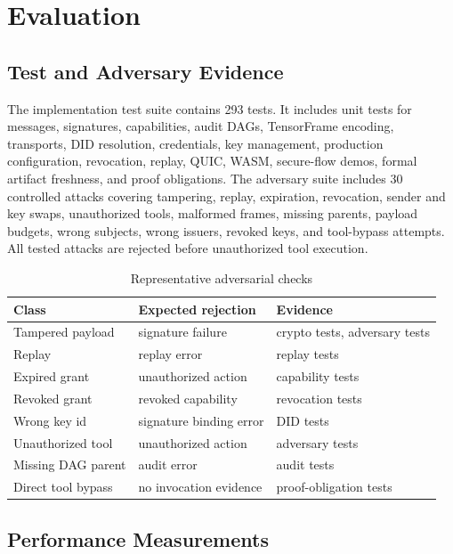 \documentclass[runningheads]{llncs}
\begin{document}
\section{Evaluation}

\subsection{Test and Adversary Evidence}

The implementation test suite contains 293 tests. It includes unit tests for messages, signatures, capabilities, audit DAGs, TensorFrame encoding, transports, DID resolution, credentials, key management, production configuration, revocation, replay, QUIC, WASM, secure-flow demos, formal artifact freshness, and proof obligations. The adversary suite includes 30 controlled attacks covering tampering, replay, expiration, revocation, sender and key swaps, unauthorized tools, malformed frames, missing parents, payload budgets, wrong subjects, wrong issuers, revoked keys, and tool-bypass attempts. All tested attacks are rejected before unauthorized tool execution.

\begin{table}
\caption{Representative adversarial checks}
\label{tab:adversary}
\centering
\begin{tabular}{lll}
\toprule
Class & Expected rejection & Evidence \\
\midrule
Tampered payload & signature failure & crypto tests, adversary tests \\
Replay & replay error & replay tests \\
Expired grant & unauthorized action & capability tests \\
Revoked grant & revoked capability & revocation tests \\
Wrong key id & signature binding error & DID tests \\
Unauthorized tool & unauthorized action & adversary tests \\
Missing DAG parent & audit error & audit tests \\
Direct tool bypass & no invocation evidence & proof-obligation tests \\
\bottomrule
\end{tabular}
\end{table}

\subsection{Performance Measurements}
\end{document}
